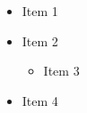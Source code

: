 \documentclass[9pt,aspectratio=169]{beamer}
\begin{document}
\begin{frame}

\begin{itemize}
    \item<1-|alert@3-> Item 1
    \item Item 2
    \begin{itemize}
        \item<2-|alert@3-> Item 3
    \end{itemize}
    \item Item 4
\end{itemize}

\end{frame}
\end{document}
